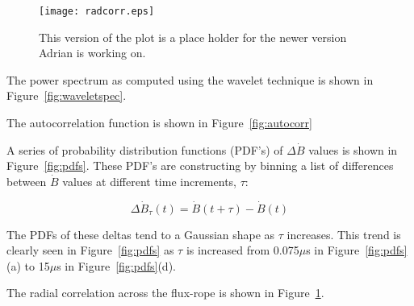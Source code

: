 \documentclass[12pt]{iopart}
\begin{document}
\begin{figure}[!htbp]
\centerline{
\texttt{[image: radcorr.eps]}}
\caption{\label{fig:radcorr} This version of the plot is a place holder for the newer version Adrian is working on.}
\end{figure}

The power spectrum as computed using the wavelet technique is shown in Figure~\ref{fig:waveletspec}.

The autocorrelation function is shown in Figure~\ref{fig:autocorr}

A series of probability distribution functions (PDF's) of $\Delta \dot{B}$ values is shown in Figure~\ref{fig:pdfs}. These PDF's are constructing by binning a list of differences between $\dot{B}$ values at different time increments, $\tau$:

\begin{equation}
\Delta \dot{B}_{\tau}(t) = \dot{B}(t+\tau)-\dot{B}(t)
\label{eq:increments}
\end{equation}

The PDFs of these deltas tend to a Gaussian shape as $\tau$ increases. This trend is clearly seen in Figure~\ref{fig:pdfs} as $\tau$ is increased from 0.075$\mu$s in Figure~\ref{fig:pdfs}(a) to 15$\mu$s in Figure~\ref{fig:pdfs}(d).


The radial correlation across the flux-rope is shown in Figure~\ref{fig:radcorr}.
\end{document}
